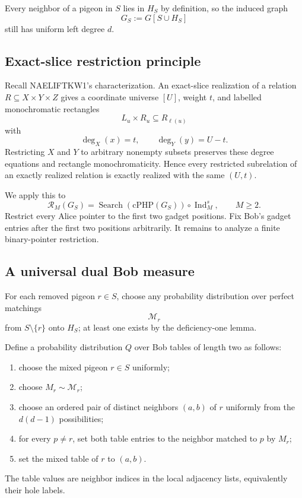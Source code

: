 \documentclass[11pt]{article}
\begin{document}
Every neighbor of a pigeon in $S$ lies in $H_S$ by definition, so the induced graph
\[
G_S:=G[S\cup H_S]
\]
still has uniform left degree $d$.

\subsection{Exact-slice restriction principle}
Recall NAELIFTKW1's characterization. An exact-slice realization of a relation $R\subseteq X\times Y\times Z$ gives a coordinate universe $[U]$, weight $t$, and labelled monochromatic rectangles
\[
L_u\times R_u\subseteq R_{\ell(u)}
\]
with
\[
\deg_X(x)=t,\qquad
\deg_Y(y)=U-t.
\]
Restricting $X$ and $Y$ to arbitrary nonempty subsets preserves these degree equations and rectangle monochromaticity. Hence every restricted subrelation of an exactly realized relation is exactly realized with the same $(U,t)$.

We apply this to
\[
\mathcal R_M(G_S)
=
\operatorname{Search}(\mathrm{cPHP}(G_S))
\circ\operatorname{Ind}_M^s,
\qquad M\ge2.
\]
Restrict every Alice pointer to the first two gadget positions. Fix Bob's gadget entries after the first two positions arbitrarily. It remains to analyze a finite binary-pointer restriction.

\subsection{A universal dual Bob measure}
For each removed pigeon $r\in S$, choose any probability distribution over perfect matchings
\[
\mathcal M_r
\]
from $S\setminus\{r\}$ onto $H_S$; at least one exists by the deficiency-one lemma.

Define a probability distribution $Q$ over Bob tables of length two as follows:
\begin{enumerate}
\item choose the mixed pigeon $r\in S$ uniformly;
\item choose $M_r\sim\mathcal M_r$;
\item choose an ordered pair of distinct neighbors $(a,b)$ of $r$ uniformly from the $d(d-1)$ possibilities;
\item for every $p\ne r$, set both table entries to the neighbor matched to $p$ by $M_r$;
\item set the mixed table of $r$ to $(a,b)$.
\end{enumerate}
The table values are neighbor indices in the local adjacency lists, equivalently their hole labels.
\end{document}
